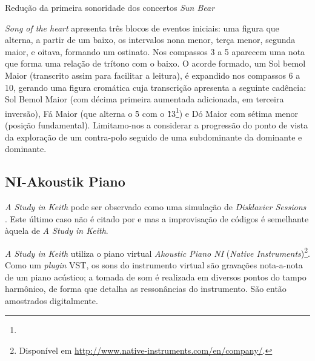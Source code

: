 \begin{example}{Redução da primeira sonoridade dos concertos \emph{Sun Bear}}\label{ex:schenker}


\emph{Song of the heart} apresenta três blocos de eventos iniciais: uma figura que alterna, a partir de um baixo, os intervalos nona menor, terça menor, segunda maior, e oitava, formando um ostinato. Nos compassos 3 a 5 aparecem uma nota que forma uma relação de trítono com o baixo. O acorde formado, um Sol bemol Maior (transcrito assim para facilitar a leitura), é expandido nos compassos 6 a 10, gerando uma figura cromática cuja transcrição apresenta a seguinte cadência: Sol Bemol Maior (com décima primeira aumentada adicionada, em terceira inversão), Fá Maior (que alterna o \^5 com o \^13\footnote{}) e Dó Maior com sétima menor (posição fundamental). Limitamo-nos a considerar a progressão do ponto de vista da exploração de um contra-polo seguido de uma subdominante da dominante e dominante.  

\centering{}
\end{example}


\subsection{NI-Akoustik Piano}\label{sec:NI}

\emph{A Study in Keith} pode ser observado como uma simulação de \emph{Disklavier Sessions} . Este último caso não é citado por   e  mas a improvisação de códigos é semelhante àquela de \emph{A Study in Keith}.

\emph{A Study in Keith} utiliza o piano virtual \emph{Akoustic Piano NI} (\emph{Native Instruments})\footnote{Disponível em \url{http://www.native-instruments.com/en/company/}.}. Como um \emph{plugin} VST, os sons do instrumento virtual são gravações nota-a-nota de um piano acústico; a tomada de som é realizada em diversos pontos do tampo harmônico, de forma que detalha as ressonâncias do instrumento. São então amostrados digitalmente.

